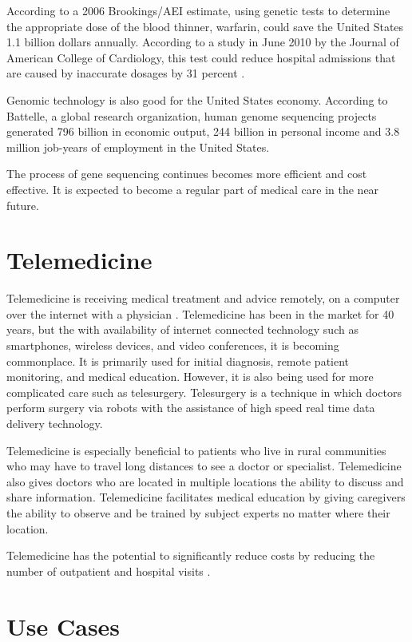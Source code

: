\documentclass[sigconf]{acmart}
\begin{document}
According to a 2006 Brookings/AEI estimate, using genetic tests to determine the appropriate dose of the blood thinner, warfarin, could save the United States 1.1 billion dollars annually.  According to a study in June 2010 by the Journal of American College of Cardiology, this test could reduce hospital admissions that are caused by inaccurate dosages by 31 percent \cite{www-google-geno}.

Genomic technology is also good for the United States economy. According to Battelle, a global research organization, human genome sequencing projects generated 796 billion in economic output, 244 billion in personal income and 3.8 million job-years of employment in the United States. 

The process of gene sequencing continues becomes more efficient and cost effective.  It is expected to become a regular part of medical care in the near future.
 

\section{Telemedicine}

Telemedicine is receiving medical treatment and advice remotely, on a computer over the internet with a physician \cite{www-google-forbes042015}.  Telemedicine has been in the market for 40 years, but the with availability of internet connected technology such as smartphones, wireless devices, and video conferences, it is becoming commonplace.  It is primarily used for initial diagnosis, remote patient monitoring, and medical education.  However, it is also being used for more complicated care such as telesurgery. Telesurgery is a technique in which doctors perform surgery via robots with the assistance of high speed real time data delivery technology.

Telemedicine is especially beneficial to patients who live in rural communities who may have to travel long distances to see a doctor or specialist.  Telemedicine also gives doctors who are located in multiple locations the ability to discuss and share information. Telemedicine facilitates medical education by giving caregivers the ability to observe and be trained by subject experts no matter where their location.

Telemedicine has the potential to significantly reduce costs by reducing the number of outpatient and hospital visits \cite{www-google-wikitele}.

 \section{Use Cases}
 
\end{document}
